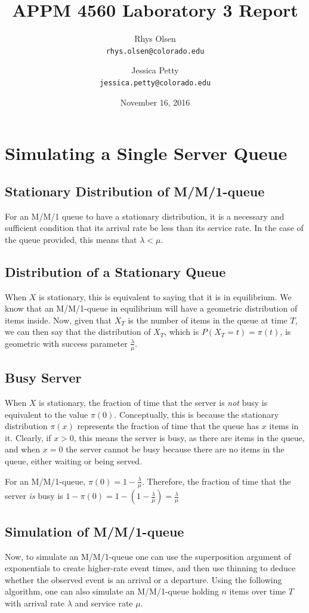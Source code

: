 \documentclass[11pt, oneside]{article}
\title{APPM 4560 Laboratory 3 Report}
\author{Rhys Olsen\\
\texttt{rhys.olsen@colorado.edu}
 \and Jessica Petty\\
 \texttt{jessica.petty@colorado.edu}
 }
\date{November 16, 2016}
\begin{document}
\maketitle
\section{Simulating a Single Server Queue}
\subsection{Stationary Distribution of M/M/1-queue}
For an M/M/1 queue to have a stationary distribution, it is a necessary and sufficient condition that its arrival rate be less than its service rate. In the case of the queue provided, this means that $\lambda < \mu$.

\subsection{Distribution of a Stationary Queue}
When $X$ is stationary, this is equivalent to saying that it is in equilibrium. We know that an M/M/1-queue in equilibrium will have a geometric distribution of items inside. Now, given that $X_T$ is the number of items in the queue at time $T$, we can then say that the distribution of $X_T$, which is $P(X_T = t) = \pi(t)$, is geometric with success parameter $\frac{\lambda}{\mu}$.

\subsection{Busy Server}
When $X$ is stationary, the fraction of time that the server is \textit{not} busy is equivalent to the value $\pi(0)$. Conceptually, this is because the stationary distribution $\pi(x)$ represents the fraction of time that the queue has $x$ items in it. Clearly, if $x > 0$, this means the server is busy, as there are items in the queue, and when $x=0$ the server cannot be busy because there are no items in the queue, either waiting or being served.

For an M/M/1-queue, $\pi(0)=1-\frac{\lambda}{\mu}$. Therefore, the fraction of time that the server \textit{is} busy is $1-\pi(0)=1-(1-\frac{\lambda}{\mu})=\frac{\lambda}{\mu}$

\subsection{Simulation of M/M/1-queue}
Now, to simulate an M/M/1-queue one can use the superposition argument of exponentials to create higher-rate event times, and then use thinning to deduce whether the observed event is an arrival or a departure. Using the following algorithm, one can also simulate an M/M/1-queue holding $n$ items over time $T$ with arrival rate $\lambda$ and service rate $\mu$.
\end{document}
